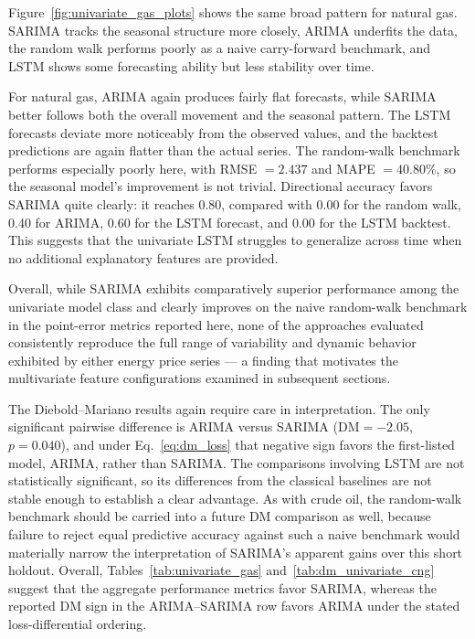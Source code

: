 \documentclass[pdflatex,sn-mathphys-num]{sn-jnl}%
\theoremstyle{thmstyleone}%
\theoremstyle{thmstyletwo}%
\theoremstyle{thmstylethree}%
\begin{document}
Figure~\ref{fig:univariate_gas_plots} shows the same broad pattern for natural gas. SARIMA tracks the seasonal structure more closely, ARIMA underfits the data, the random walk performs poorly as a naive carry-forward benchmark, and LSTM shows some forecasting ability but less stability over time.

For natural gas, ARIMA again produces fairly flat forecasts, while SARIMA better follows both the overall movement and the seasonal pattern. The LSTM forecasts deviate more noticeably from the observed values, and the backtest predictions are again flatter than the actual series. The random-walk benchmark performs especially poorly here, with RMSE $=2.437$ and MAPE $=40.80\%$, so the seasonal model's improvement is not trivial. Directional accuracy favors SARIMA quite clearly: it reaches 0.80, compared with 0.00 for the random walk, 0.40 for ARIMA, 0.60 for the LSTM forecast, and 0.00 for the LSTM backtest. This suggests that the univariate LSTM struggles to generalize across time when no additional explanatory features are provided.

Overall, while SARIMA exhibits comparatively superior performance among the univariate model class and clearly improves on the naive random-walk benchmark in the point-error metrics reported here, none of the approaches evaluated consistently reproduce the full range of variability and dynamic behavior exhibited by either energy price series --- a finding that motivates the multivariate feature configurations examined in subsequent sections.

The Diebold--Mariano results again require care in interpretation. The only significant pairwise difference is ARIMA versus SARIMA ($\mathrm{DM}=-2.05$, $p=0.040$), and under Eq.~\ref{eq:dm_loss} that negative sign favors the first-listed model, ARIMA, rather than SARIMA. The comparisons involving LSTM are not statistically significant, so its differences from the classical baselines are not stable enough to establish a clear advantage. As with crude oil, the random-walk benchmark should be carried into a future DM comparison as well, because failure to reject equal predictive accuracy against such a naive benchmark would materially narrow the interpretation of SARIMA's apparent gains over this short holdout. Overall, Tables~\ref{tab:univariate_gas} and~\ref{tab:dm_univariate_cng} suggest that the aggregate performance metrics favor SARIMA, whereas the reported DM sign in the ARIMA--SARIMA row favors ARIMA under the stated loss-differential ordering.
\end{document}
